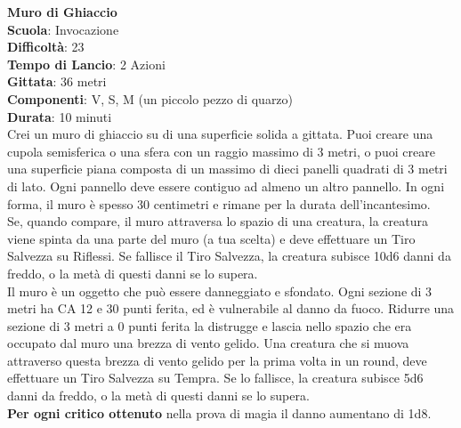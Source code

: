 \begin{multicols}{2}
\medskip\textbf{Muro di Ghiaccio}\\
\textbf{Scuola}: Invocazione\\
\textbf{Difficoltà}:  23\\
\textbf{Tempo di Lancio}: 2 Azioni\\
\textbf{Gittata}: 36 metri\\
\textbf{Componenti}: V, S, M (un piccolo pezzo di quarzo)\\
\textbf{Durata}: 10 minuti\\
Crei un muro di ghiaccio su di una superficie solida a gittata. Puoi creare una cupola semisferica o una sfera con un raggio massimo di 3 metri, o puoi creare una superficie piana composta di un massimo di dieci panelli quadrati di 3 metri di lato. Ogni pannello deve essere contiguo ad almeno un altro pannello. In ogni forma, il muro è spesso 30 centimetri e rimane per la durata dell'incantesimo. \\
Se, quando compare, il muro attraversa lo spazio di una creatura, la creatura viene spinta da una parte del muro (a tua scelta) e deve effettuare un Tiro Salvezza su Riflessi. Se fallisce il Tiro Salvezza, la creatura subisce 10d6 danni da freddo, o la metà di questi danni se lo supera.\\
Il muro è un oggetto che può essere danneggiato e sfondato. Ogni sezione di 3 metri ha CA 12 e 30 punti ferita, ed è vulnerabile al danno da fuoco. Ridurre una sezione di 3 metri a 0 punti ferita la distrugge e lascia nello spazio che era occupato dal muro una brezza di vento gelido. Una creatura che si muova attraverso questa brezza di vento gelido per la prima volta in un round, deve effettuare un Tiro Salvezza su Tempra. Se lo fallisce, la creatura subisce 5d6 danni da freddo, o la metà di questi danni se lo supera.\\
\textbf{Per ogni critico ottenuto} nella prova di magia il danno aumentano di 1d8.


\end{multicols}
